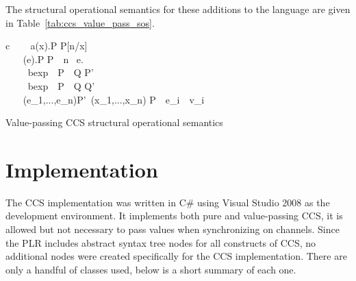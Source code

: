 	The structural operational semantics for these additions to the language are given in Table~\ref{tab:ccs_value_pass_sos}.	

\begin{table}[t]
	\begin{ARRAY}{c}
		\ \ \ \Inference{                              }
	                            {a(x).P  P[n/x]} \vspace{10pt}\\
	\ \ \ \Inference{                              }
	                            {(e).P  P}\ \ n \ e. \vspace{10pt}\\
		\ \ \ 
	                            {\ bexp\ \ P\  \ Q \infarrow{\alpha} P'}\ \  \vspace{10pt}\\
		\ \ \ 
	                            {\ bexp\ \ P\  \ Q \infarrow{\alpha} Q'}\ \  \vspace{10pt}\\

		\ \ \ 
	 {(e_1,...,e_n)\infarrow{\alpha}P'}\ (x_1,...,x_n)  P\ \ e_i\ \ v_i\vspace{10pt}\\
	                            
	\end{ARRAY}
	\caption{Value-passing CCS structural operational semantics}
	\label{tab:ccs_value_pass_sos}
\end{table}


\section{Implementation}

	The CCS implementation was written in C\# using Visual Studio 2008 as the 
	development environment. It implements both pure and value-passing CCS, it 
	is allowed but not necessary to pass values when synchronizing on channels. 
	Since the PLR includes abstract syntax tree nodes for all constructs of CCS, 
	no additional nodes were created specifically for the CCS implementation. 
	There are only a handful of classes used, below is a short summary of each 
	one.

